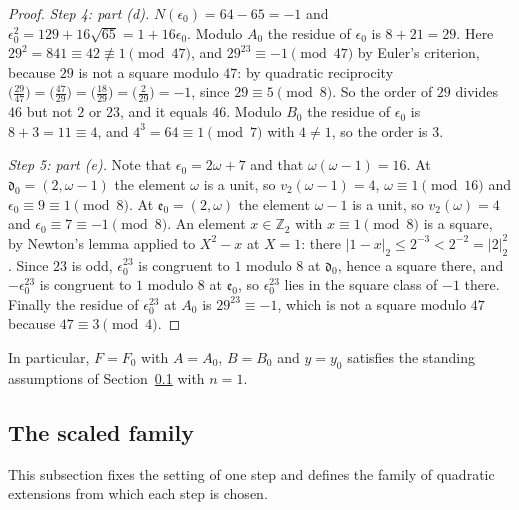 \documentclass[11pt]{article}
\theoremstyle{plain}
\theoremstyle{definition}
\theoremstyle{remark}
\newcommand{\Z}{\mathbb Z}
\begin{document}
\begin{proof}
\emph{Step 4: part (d).}  $N(\epsilon_0)=64-65=-1$ and
$\epsilon_0^2=129+16\sqrt{65}=1+16\epsilon_0$.  Modulo $A_0$ the residue
of $\epsilon_0$ is $8+21=29$.  Here $29^2=841\equiv42\not\equiv1\pmod{47}$,
and $29^{23}\equiv-1\pmod{47}$ by Euler's criterion, because $29$ is not a
square modulo $47$: by quadratic reciprocity
$\bigl(\tfrac{29}{47}\bigr)=\bigl(\tfrac{47}{29}\bigr)
=\bigl(\tfrac{18}{29}\bigr)=\bigl(\tfrac{2}{29}\bigr)=-1$, since
$29\equiv5\pmod8$.  So the order of $29$ divides $46$ but not $2$ or $23$,
and it equals $46$.  Modulo $B_0$ the residue of $\epsilon_0$ is
$8+3=11\equiv4$, and $4^3=64\equiv1\pmod7$ with $4\ne1$, so the order is
$3$.

\emph{Step 5: part (e).}  Note that $\epsilon_0=2\omega+7$ and that
$\omega(\omega-1)=16$.  At $\mathfrak d_0=(2,\omega-1)$ the element
$\omega$ is a unit, so $v_2(\omega-1)=4$, $\omega\equiv1\pmod{16}$ and
$\epsilon_0\equiv9\equiv1\pmod8$.  At $\mathfrak e_0=(2,\omega)$ the element
$\omega-1$ is a unit, so $v_2(\omega)=4$ and
$\epsilon_0\equiv7\equiv-1\pmod8$.  An element $x\in\Z_2$ with
$x\equiv1\pmod8$ is a square, by Newton's lemma
\cite[Theorem~7.32]{MilneANT} applied to $X^2-x$ at $X=1$: there
$|1-x|_2\le2^{-3}<2^{-2}=|2|_2^2$.  Since $23$ is odd, $\epsilon_0^{23}$ is
congruent to $1$ modulo $8$ at $\mathfrak d_0$, hence a square there, and
$-\epsilon_0^{23}$ is congruent to $1$ modulo $8$ at $\mathfrak e_0$, so
$\epsilon_0^{23}$ lies in the square class of $-1$ there.  Finally the
residue of $\epsilon_0^{23}$ at $A_0$ is $29^{23}\equiv-1$, which is not a
square modulo $47$ because $47\equiv3\pmod4$.
\end{proof}

In particular, $F=F_0$ with $A=A_0$, $B=B_0$ and $y=y_0$ satisfies the
standing assumptions of Section~\ref{sec:scaled-family} with $n=1$.

\subsection{The scaled family}\label{sec:scaled-family}

This subsection fixes the setting of one step and defines the family of
quadratic extensions from which each step is chosen.
\end{document}
